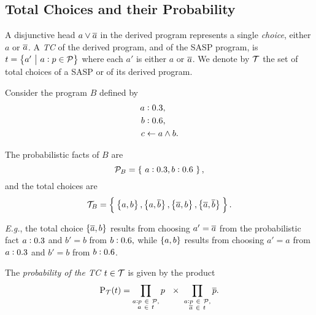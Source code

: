 \documentclass[x11names]{tlp}
\begin{document}
\subsection*{Total Choices and their Probability}
\label{ssec:totalchoices.probabilities}

A disjunctive head $a \vee \overline{a}$ in the derived program represents a
single \textit{choice}, either $a$ or $\overline{a}$. A \textit{\acl{TC}} of the
derived program, and of the \ac{SASP} program, is $t = \set{a' \given
		\probfact{a}{p} \in \PROBFset}$ where each $a'$ is either $a$ or $\overline{a}$. We
denote by $\TCHOICEset$ the set of total choices of a \ac{SASP} or of its
derived program.

\ifExamples
	\begin{example}
		\label{ex:total.choices}\em

		Consider the program $B$ defined by
		\begin{equation*}
			\begin{split}
				\probfact{a & }{0.3},             %
				\\
				\probfact{b & }{0.6},             %
				\\
				c           & \clause a \wedge b.
			\end{split}\label{eq:total.choices}
		\end{equation*}

		The probabilistic facts of $B$ are
		\[ \PROBFset_{B} = \set{~\probfact{a}{0.3}, \probfact{b}{0.6}~}, \]
		and the total choices are
		\begin{equation*}
			\TCHOICEset_{B} = \set[2]{\:
				\set[1]{a, b},
				\set[1]{a, \co{b}},
				\set[1]{\co{a}, b},
				\set[1]{\co{a}, \co{b}}\: }.
		\end{equation*}

		\emph{E.g.}, the total choice $\set{\ensuremath{\overline{a}}, b} $ results from choosing $a' =
			\overline{a}$ from the probabilistic fact $a:0.3$ and $b' = b$ from
		$b:0.6, $ while $\set{a, b} $ results from choosing $a' =
			a$ from $a:0.3$ and $b' = b$ from $b:0.6$.

	\end{example}
\fi

The \emph{probability of the \acl{TC} $t \in \TCHOICEset$} is given by the
product
\begin{equation}
	\prT\at{t} =
	\prod_{\substack{
			\probfact{a}{p}~ \in ~\PROBFset,%
	\\
			a~ \in~ t}} p\ \ \times\
	\prod_{\substack{
			\probfact{a}{p}~ \in ~\PROBFset,%
	\\
			\co{a}~\in~ t}} \co{p}.
	\label{eq:prob.total.choice}
\end{equation}
\end{document}
